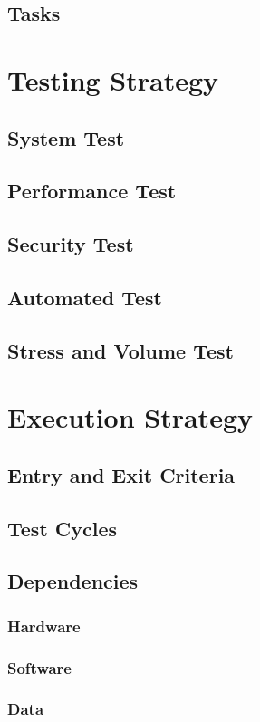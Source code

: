 \documentclass[english]{article}
\begin{document}
		\subsection{Tasks}
		
	\section{Testing Strategy}
		\subsection{System Test}
		\subsection{Performance Test}
		\subsection{Security Test}
		\subsection{Automated Test}
		\subsection{Stress and Volume Test}
	
	\section{Execution Strategy}
		\subsection{Entry and Exit Criteria}
		\subsection{Test Cycles}
		\subsection{Dependencies}
			\subsubsection{Hardware}
			\subsubsection{Software}
			\subsubsection{Data}
			
\end{document}
